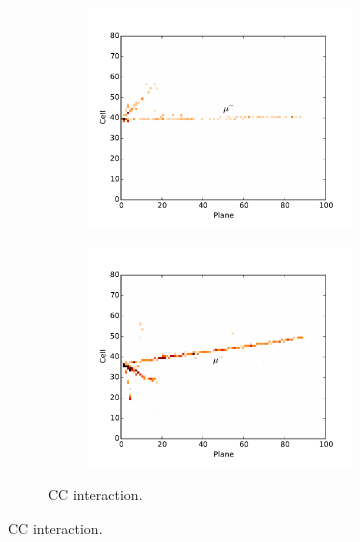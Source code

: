 \begin{figure}[t]

\begin{subfigure}[c]{\textwidth}
\centering
\begin{subfigure}[c]{0.47\textwidth}
\includegraphics[width=\textwidth]{figures/cnn/view_truetype2_caltype2_event274_x.pdf}
\vspace{-20pt}
\caption*{\xview}
\end{subfigure}
\begin{subfigure}[c]{0.47\textwidth}
\includegraphics[width=\textwidth]{figures/cnn/view_truetype2_caltype2_event274_y.pdf}
\vspace{-20pt}
\caption*{\yview}
\end{subfigure}
\vspace{-10pt}
\caption{\numu CC interaction.}
\label{pixnumu}
\end{subfigure}


\end{figure}
